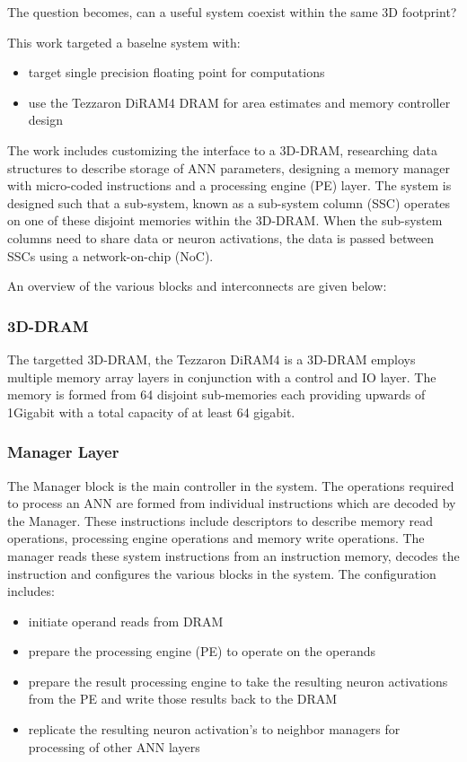 \documentclass[journal]{IEEEtran}
\begin{document}
The question becomes, can a useful system coexist within the same 3D footprint?

This work targeted a baselne system with:
\begin{itemize}
  \itemsep0em 
  \item target single precision floating point for computations
  \item use the Tezzaron DiRAM4 DRAM for area estimates and memory controller design
\end{itemize}
The work includes customizing the interface to a 3D-DRAM, researching data structures to describe storage of ANN parameters, designing a memory manager with micro-coded instructions and a processing engine (PE) layer.  
The system is designed such that a sub-system, known as a sub-system column (SSC) operates on one of these disjoint memories within the 3D-DRAM. When the sub-system columns need to share data or neuron activations, the data is passed between SSCs using a network-on-chip (NoC).

An overview of the various blocks and interconnects are given below:

\subsubsection{3D-DRAM}
The targetted 3D-DRAM, the Tezzaron DiRAM4 is a 3D-DRAM employs multiple memory array layers in conjunction with a control and IO layer.
The memory is formed from 64 disjoint sub-memories each providing upwards of 1Gigabit with a total capacity of at least 64 gigabit.

\subsubsection{Manager Layer}
The Manager block is the main controller in the system. The operations required to process an ANN are formed from individual instructions which are decoded by the Manager. 
These instructions include descriptors to describe memory read operations, processing engine operations and memory write operations. The manager reads these system instructions from an instruction memory, decodes the instruction and configures the various blocks in the system.
The configuration includes:
\begin{itemize}

      \item initiate operand reads from DRAM
      \item prepare the processing engine (PE) to operate on the operands
      \item prepare the result processing engine to take the resulting neuron activations from the PE and write those results back to the DRAM
      \item replicate the resulting neuron activation's to neighbor managers for processing of other ANN layers

\end{itemize}
\end{document}
